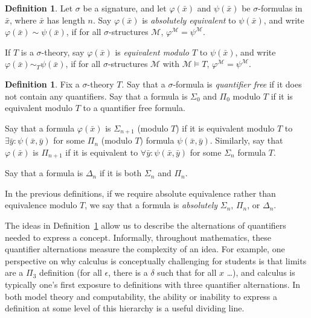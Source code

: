 \documentclass{article}
\theoremstyle{plain}
\theoremstyle{definition}
\newtheorem{defn}[thm]{Definition}
\newcommand{\defterm}{\emph}
\newcommand{\tuple}{\bar}
\renewcommand{\phi}{\varphi}
\begin{document}
\begin{defn}
  Let $\sigma$ be a signature, and let $\phi(\tuple{x})$ and
  $\psi(\tuple{x})$ be $\sigma$-formulas in $\tuple{x}$, where
  $\tuple{x}$ has length $n$. Say $\phi(\tuple{x})$ is
  \defterm{absolutely equivalent} to $\psi(\tuple{x})$, and write
  $\phi(\tuple{x}) \sim \psi(\tuple{x})$, if for all
  $\sigma$-structures $\mathcal{M}$, $\phi^\mathcal{M} =
  \psi^\mathcal{M}$.

  If $T$ is a $\sigma$-theory, say $\phi(\tuple{x})$ is
  \defterm{equivalent modulo $T$} to $\psi(\tuple{x})$, and write
  $\phi(\tuple{x}) \sim_T \psi(\tuple{x})$, if for all
  $\sigma$-structures $\mathcal{M}$ with $\mathcal{M} \models T$,
  $\phi^\mathcal{M} = \psi^\mathcal{M}$.
\end{defn}

\begin{defn}\label{defn:quantifier-depth}
  Fix a $\sigma$-theory $T$. Say that a $\sigma$-formula is
  \defterm{quantifier free} if it does not contain any
  quantifiers. Say that a formula is $\Sigma_0$ and $\Pi_0$ modulo $T$
  if it is equivalent modulo $T$ to a quantifier free formula.

  Say that a formula $\phi(\tuple{x})$ is $\Sigma_{n+1}$ (modulo $T$)
  if it is equivalent modulo $T$ to $\exists \tuple{y} :
  \psi(\tuple{x}, \tuple{y})$ for some $\Pi_n$ (modulo $T$) formula
  $\psi(\tuple{x}, \tuple{y})$. Similarly, say that $\phi(\tuple{x})$
  is $\Pi_{n+1}$ if it is equivalent to $\forall \tuple{y} :
  \psi(\tuple{x}, \tuple{y})$ for some $\Sigma_n$ formula $T$.

  Say that a formula is $\Delta_n$ if it is both $\Sigma_n$ and
  $\Pi_n$.

  In the previous definitions, if we require absolute equivalence
  rather than equivalence modulo $T$, we say that a formula is
  \defterm{absolutely} $\Sigma_n$, $\Pi_n$, or $\Delta_n$.
\end{defn}

The ideas in Definition~\ref{defn:quantifier-depth} allow us to
describe the alternations of quantifiers needed to express a
concept. Informally, throughout mathematics, these quantifier
alternations measure the complexity of an idea. For example, one
perspective on why calculus is conceptually challenging for students
is that limits are a $\Pi_3$ definition (for all $\epsilon$, there is
a $\delta$ such that for all $x$ \ldots), and calculus is typically
one's first exposure to definitions with three quantifier
alternations. In both model theory and computability, the ability or
inability to express a definition at some level of this hierarchy is a
useful dividing line.
\end{document}
